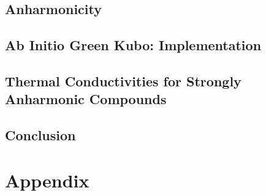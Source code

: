 \documentclass[nobib,a4paper,twoside,notoc,justified,marginals=justified]{tufte-book}
\begin{document}
\chapter{Anharmonicity}


\chapter{Ab Initio Green Kubo: Implementation}


\chapter{Thermal Conductivities for Strongly Anharmonic Compounds}




\chapter*{Conclusion}



\cleardoublepage
{}
{}


\printbibliography

\newcommand{\bibsection}{\section{Bibliography}} %

\part*{Appendix}


\begin{appendices}
  
\end{appendices}

\backmatter




\end{document}
